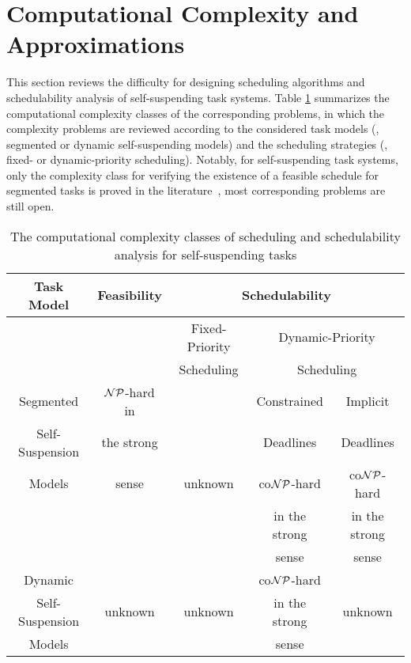 \section{Computational Complexity and Approximations}
\label{sec:hardness}
This section reviews the difficulty for designing scheduling algorithms and schedulability analysis of self-suspending task systems. Table \ref{table:complexity} summarizes the computational complexity classes of the corresponding problems, in which the complexity problems are reviewed according to the considered task models (\ie, segmented or dynamic self-suspending models) and the scheduling strategies (\ie, fixed- or dynamic-priority scheduling). Notably, for self-suspending task systems, only the complexity class for verifying the existence of a feasible schedule for segmented tasks is proved in the literature~\cite{Ric03,Ridouard_2004}, most corresponding problems are still open.

\begin{table}[t]
\centering
    \begin{tabular}{|c|c|c|c|c|}
 \hline
        Task Model & Feasibility & \multicolumn{3}{c|}{Schedulability} \\
        \hline
        &  & Fixed-Priority & \multicolumn{2}{c|}{Dynamic-Priority}\\
        &  & Scheduling     & \multicolumn{2}{c|}{Scheduling}\\
        \cline{3-5}    
        Segmented & ${\cal NP}$-hard in &  & Constrained & Implicit\\
         Self-Suspension  & the strong &   & Deadlines   & Deadlines \\
        \cline{4-5}
        Models & sense \cite{Ridouard_2004} & unknown & co${\cal NP}$-hard & co${\cal NP}$-hard \\
        &  & & in the strong & in the strong\\
        & & & sense & sense\\
        \hline
        Dynamic & \multirow{3}{*}{unknown} & & co${\cal NP}$-hard& \multirow{3}{*}{unknown}\\
         Self-Suspension & & unknown &in the strong& \\
        Models & & & sense & \\
        \hline
    \end{tabular}
    \vskip 0.2in
    \caption{The computational complexity classes of scheduling and schedulability analysis for self-suspending tasks}
    \label{table:complexity}
\end{table}

